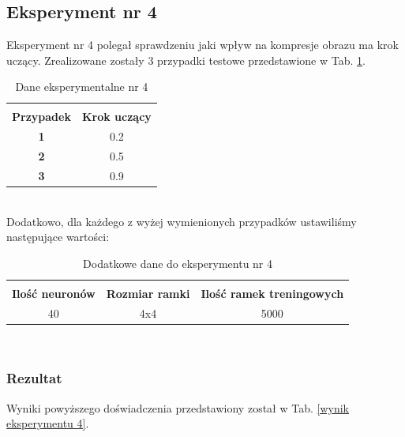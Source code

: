 \documentclass[12pt]{article}
\begin{document}
\subsection{Eksperyment nr 4}

Eksperyment nr 4 polegał sprawdzeniu jaki wpływ na kompresje obrazu ma krok uczący. Zrealizowane zostały 3 przypadki testowe przedstawione w Tab.  
\ref{dane eksperymentalne doświadczenia 4}. \\
\begin{table}[h!]
 \caption{Dane eksperymentalne nr 4}
 \centering
 \vspace{0.2cm}
 \begin{tabular}{c c}
  \hline\hline\\[-0.4cm]
  \textbf{Przypadek} & \textbf{Krok uczący} \\[0.1cm]
  \textbf{1} & 0.2  \\
  \textbf{2} & 0.5  \\
  \textbf{3} & 0.9  \\  [0.1cm]
  \hline
 \end{tabular}
 \label{dane eksperymentalne doświadczenia 4}
\end{table} \\

Dodatkowo, dla każdego z wyżej wymienionych przypadków ustawiliśmy następujące wartości: \\
\begin{table}[h!]
 \caption{Dodatkowe dane do eksperymentu nr 4}
 \centering
 \vspace{0.2cm}
 \begin{tabular}{c c c}
  \hline\hline\\[-0.4cm]
  \textbf{Ilość neuronów} & \textbf{Rozmiar ramki} & \textbf{Ilość ramek treningowych} \\[0.1cm]
  40 & 4x4 & 5000  \\ [0.1cm]
  \hline
 \end{tabular}
 \label{dodatkowe dane do eksperymentu nr 4}
\end{table} \\

\newpage
\subsubsection{Rezultat}

Wyniki powyższego doświadczenia przedstawiony został w Tab. 
\ref{wynik eksperymentu 4}.
\end{document}
